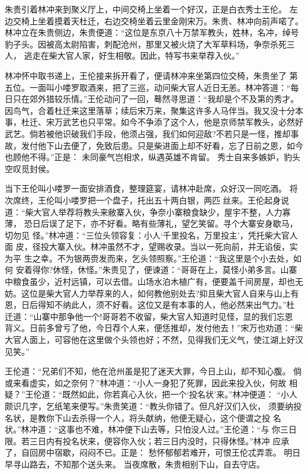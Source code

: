 朱贵引着林冲来到聚义厅上，中间交椅上坐着一个好汉，正是白衣秀士王伦。
左边交椅上坐着摸着天杜迁，右边交椅坐着云里金刚宋万。朱贵、林冲向前声喏了。
林冲立在朱贵侧边，朱贵便道：“这位是东京八十万禁军教头，姓林，名冲，绰号
豹子头。因被高太尉陷害，刺配沧州，那里又被火烧了大军草料场，争奈杀死三人，
逃走在柴大官人家，好生相敬。因此，特写书来举荐入伙。”

林冲怀中取书递上，王伦接来拆开看了，便请林冲来坐第四位交椅，朱贵坐了
第五位。一面叫小喽罗取酒来，把了三巡，动问柴大官人近日无恙。林冲答道：“每
日只在郊外猎较乐情。”王伦动问了一回，蓦然寻思道：“我却是个不及第的秀才。
因鸟气，合着杜迁来这里落草；续后宋万来，聚集这许多人马伴当。我又没十分本
事，杜迁、宋万武艺也只平常。如今不争添了这个人，他是京师禁军教头，必然好
武艺。倘若被他识破我们手段，他须占强，我们如何迎敌?不若只是一怪，推却事
故，发付他下山去便了，免致后患。只是柴进面上却不好看，忘了日前之恩，如今
也顾他不得。”正是：
未同豪气岂相求，纵遇英雄不肯留。
秀士自来多嫉妒，豹头空叹觅封侯。

当下王伦叫小喽罗一面安排酒食，整理筵宴，请林冲赴席，众好汉一同吃酒。
将次席终，王伦叫小喽罗把一个盘子，托出五十两白银，两匹丝来。王伦起身说
道：“柴大官人举荐将教头来敝寨入伙，争奈小寨粮食缺少，屋宇不整，人力寡薄，
恐日后误了足下，亦不好看。略有些薄礼，望乞笑留。寻个大寨安身歇马，切勿见
怪。”林冲道：“三位头领容复：小人‘千里投名，万里投主’，凭托柴大官人面
皮，径投大寨入伙。林冲虽然不才，望赐收录。当以一死向前，并无谄佞，实为平
生之幸。不为银两赍发而来，乞头领照察。”王伦道：“我这里是个小去处，如何
安着得你?休怪，休怪。”朱贵见了，便谏道：“哥哥在上，莫怪小弟多言。山寨
中粮食虽少，近村远镇，可以去借。山场水泊木植广有，便要盖千间房屋，却也无
妨。这位是柴大官人力举荐来的人，如何教他别处去?抑且柴大官人自来与山上有
恩，日后得知不纳此人，须不好看。这位又是有本事的人，他必然来出气力。”杜
迁道：“山寨中那争他一个!哥哥若不收留，柴大官人知道时见怪，显的我们忘恩
背义。日前多曾亏了他，今日荐个人来，便恁推却，发付他去！”宋万也劝道：“柴
大官人面上，可容他在这里做个头领也好；不然，见得我们无义气，使江湖上好汉
见笑。”

王伦道：“兄弟们不知，他在沧州虽是犯了迷天大罪，今日上山，却不知心腹。
倘或来看虚实，如之奈何？”林冲道：“小人一身犯了死罪，因此来投入伙，何故
相疑？”王伦道：“既然如此，你若真心入伙，把一个‘投名状’来。”林冲便道：
“小人颇识几字，乞纸笔来便写。”朱贵笑道：“教头你错了。但凡好汉们入伙，
须要纳投名状，是教你下山去杀得一个人，将头献纳，他便无疑心，这个便谓之投
名状。”林冲道：“这事也不难，林冲便下山去等，只怕没人过。”王伦道：“与
你三日限。若三日内有投名状来，便容你入伙；若三日内没时，只得休怪。”林冲
应承了，自回房中宿歇，闷闷不已。正是：
愁怀郁郁若难开，可恨王伦忒弄乖。
明日早寻山路去，不知那个送头来。
当夜席散，朱贵相别下山，自去守店。

